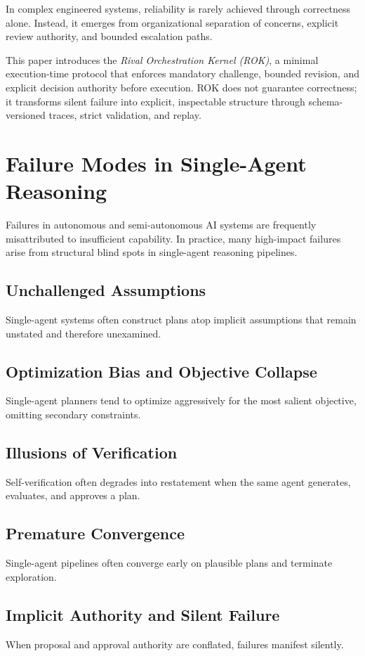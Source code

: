\documentclass[11pt]{article}
\begin{document}
In complex engineered systems, reliability is rarely achieved through correctness alone. Instead, it emerges from organizational separation of concerns, explicit review authority, and bounded escalation paths.

This paper introduces the \emph{Rival Orchestration Kernel (ROK)}, a minimal execution-time protocol that enforces mandatory challenge, bounded revision, and explicit decision authority before execution. ROK does not guarantee correctness; it transforms silent failure into explicit, inspectable structure through schema-versioned traces, strict validation, and replay.

\section{Failure Modes in Single-Agent Reasoning}
Failures in autonomous and semi-autonomous AI systems are frequently misattributed to insufficient capability. In practice, many high-impact failures arise from structural blind spots in single-agent reasoning pipelines.

\subsection{Unchallenged Assumptions}
Single-agent systems often construct plans atop implicit assumptions that remain unstated and therefore unexamined.

\subsection{Optimization Bias and Objective Collapse}
Single-agent planners tend to optimize aggressively for the most salient objective, omitting secondary constraints.

\subsection{Illusions of Verification}
Self-verification often degrades into restatement when the same agent generates, evaluates, and approves a plan.

\subsection{Premature Convergence}
Single-agent pipelines often converge early on plausible plans and terminate exploration.

\subsection{Implicit Authority and Silent Failure}
When proposal and approval authority are conflated, failures manifest silently.
\end{document}
